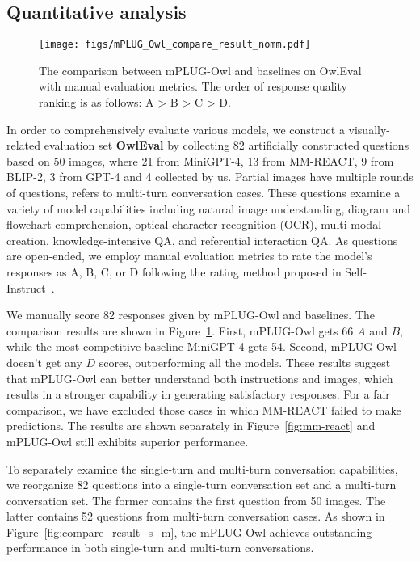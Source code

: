 \documentclass{article}
\newcommand{\modelname}{mPLUG-Owl\xspace}
\newcommand{\evalsetname}{OwlEval\xspace}
\begin{document}
 
\subsection{Quantitative analysis}

\begin{figure}[!ht]
    \centering
    \texttt{[image: figs/mPLUG\_Owl\_compare\_result\_nomm.pdf]}
    \caption{The comparison between mPLUG-Owl and baselines on \evalsetname with manual evaluation metrics. The order of response quality ranking is as follows: A > B > C > D.}
    \label{fig:compare_result}
    \vspace{-2mm}
\end{figure}

In order to comprehensively evaluate various models, we construct a visually-related evaluation set \textbf{\evalsetname} by collecting 82 artificially constructed questions based on 50 images, where 21 from MiniGPT-4, 13 from MM-REACT, 9 from BLIP-2, 3 from GPT-4 and 4 collected by us. Partial images have multiple rounds of questions, refers to multi-turn conversation cases. These questions examine a variety of model capabilities including natural image understanding, diagram and flowchart comprehension, optical character recognition (OCR), multi-modal creation, knowledge-intensive QA, and referential interaction QA. As questions are open-ended, we employ manual evaluation metrics to rate the model's responses as A, B, C, or D following the rating method proposed in Self-Instruct~\citep{self-instruct}. 



We manually score 82 responses given by \modelname and baselines. The comparison results are shown in Figure~\ref{fig:compare_result}. First, \modelname gets 66 $A$ and $B$, while the most competitive baseline MiniGPT-4 gets 54. Second, \modelname doesn't get any $D$ scores, outperforming all the models. These results suggest that \modelname can better understand both instructions and images, which results in a stronger capability in generating satisfactory responses. For a fair comparison, we have excluded those cases in which MM-REACT failed to make predictions. The results are shown separately in Figure~\ref{fig:mm-react} and \modelname still exhibits superior performance.


To separately examine the single-turn and multi-turn conversation capabilities, we reorganize 82 questions into a single-turn conversation set and a multi-turn conversation set. The former contains the first question from 50 images. The latter contains 52 questions from multi-turn conversation cases. As shown in Figure~\ref{fig:compare_result_s_m}, the \modelname achieves outstanding performance in both single-turn and multi-turn conversations.
\end{document}
